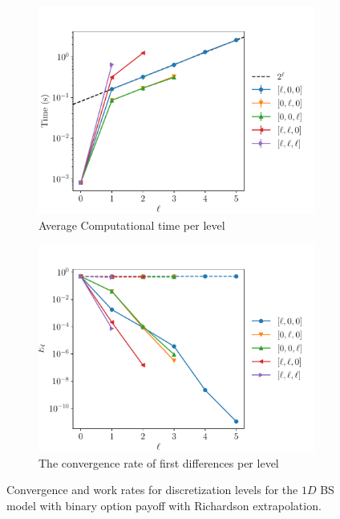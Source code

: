 \documentclass[11pt]{article}
\begin{document}
\begin{figure}[!h]
	\centering
	\begin{subfigure}{.5\textwidth}
		\centering
		\includegraphics[width=0.95\linewidth]{./figures/binary_2_4_steps/level_work.pdf}
		\caption{Average Computational time per level}
		\label{fig:misc_binary_2_4_steps_sub3}
	\end{subfigure}%
	\begin{subfigure}{.5\textwidth}
		\centering
		\includegraphics[width=0.95\linewidth]{./figures/binary_2_4_steps/levels_error_rate.pdf}
		\caption{ The convergence rate of first differences per level}
		\label{fig:misc_binary_2_4_steps_sub4}
	\end{subfigure}%
	\caption{Convergence and work rates for discretization levels for the $1D$ BS model with binary option payoff with Richardson extrapolation.}
	\label{fig:misc_binary_2_4_steps_2}
\end{figure}
\end{document}
